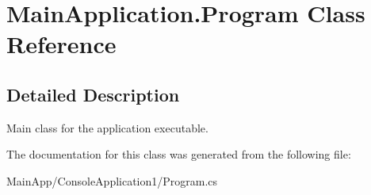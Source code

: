 \hypertarget{class_main_application_1_1_program}{}\section{Main\+Application.\+Program Class Reference}
\label{class_main_application_1_1_program}


\subsection{Detailed Description}
Main class for the application executable. 

The documentation for this class was generated from the following file\+:\begin{DoxyCompactItemize}
\item 
Main\+App/\+Console\+Application1/Program.\+cs\end{DoxyCompactItemize}
